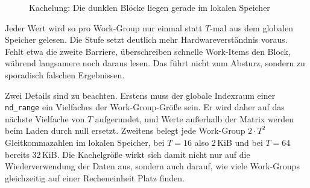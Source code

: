 \documentclass[12pt,a4paper]{article}
\begin{document}
\begin{figure}[htbp]
\centering
{}
\caption{Kachelung: Die dunklen Blöcke liegen gerade im lokalen Speicher}
\label{fig:tiling}
\end{figure}

Jeder Wert wird so pro Work-Group nur einmal statt $T$-mal aus dem globalen
Speicher gelesen. Die Stufe setzt deutlich mehr Hardwareverständnis voraus.
Fehlt etwa die zweite Barriere, überschreiben schnelle Work-Items den Block,
während langsamere noch daraus lesen. Das führt nicht zum Absturz, sondern zu
sporadisch falschen Ergebnissen.

Zwei Details sind zu beachten. Erstens muss der globale Indexraum einer
\texttt{nd\_range} ein Vielfaches der Work-Group-Größe sein. Er wird daher
auf das nächste Vielfache von $T$ aufgerundet, und Werte außerhalb der Matrix
werden beim Laden durch null ersetzt. Zweitens belegt jede Work-Group
$2 \cdot T^2$ Gleitkommazahlen im lokalen Speicher, bei $T = 16$ also 2\,KiB
und bei $T = 64$ bereits 32\,KiB. Die Kachelgröße wirkt sich damit nicht nur
auf die Wiederverwendung der Daten aus, sondern auch darauf, wie viele
Work-Groups gleichzeitig auf einer Recheneinheit Platz finden.
\end{document}
